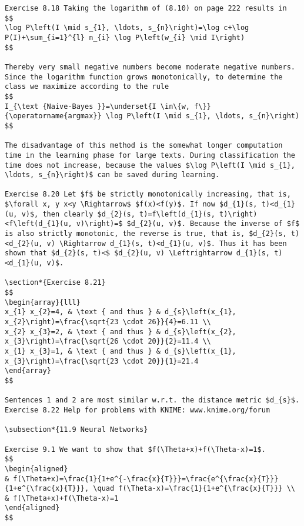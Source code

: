 \documentclass[10pt]{article}
\begin{document}
\begin{verbatim}
Exercise 8.18 Taking the logarithm of (8.10) on page 222 results in
$$
\log P\left(I \mid s_{1}, \ldots, s_{n}\right)=\log c+\log P(I)+\sum_{i=1}^{l} n_{i} \log P\left(w_{i} \mid I\right)
$$

Thereby very small negative numbers become moderate negative numbers. Since the logarithm function grows monotonically, to determine the class we maximize according to the rule
$$
I_{\text {Naive-Bayes }}=\underset{I \in\{w, f\}}{\operatorname{argmax}} \log P\left(I \mid s_{1}, \ldots, s_{n}\right)
$$

The disadvantage of this method is the somewhat longer computation time in the learning phase for large texts. During classification the time does not increase, because the values $\log P\left(I \mid s_{1}, \ldots, s_{n}\right)$ can be saved during learning.

Exercise 8.20 Let $f$ be strictly monotonically increasing, that is, $\forall x, y x<y \Rightarrow$ $f(x)<f(y)$. If now $d_{1}(s, t)<d_{1}(u, v)$, then clearly $d_{2}(s, t)=f\left(d_{1}(s, t)\right)<f\left(d_{1}(u, v)\right)=$ $d_{2}(u, v)$. Because the inverse of $f$ is also strictly monotonic, the reverse is true, that is, $d_{2}(s, t)<d_{2}(u, v) \Rightarrow d_{1}(s, t)<d_{1}(u, v)$. Thus it has been shown that $d_{2}(s, t)<$ $d_{2}(u, v) \Leftrightarrow d_{1}(s, t)<d_{1}(u, v)$.

\section*{Exercise 8.21}
$$
\begin{array}{lll}
x_{1} x_{2}=4, & \text { and thus } & d_{s}\left(x_{1}, x_{2}\right)=\frac{\sqrt{23 \cdot 26}}{4}=6.11 \\
x_{2} x_{3}=2, & \text { and thus } & d_{s}\left(x_{2}, x_{3}\right)=\frac{\sqrt{26 \cdot 20}}{2}=11.4 \\
x_{1} x_{3}=1, & \text { and thus } & d_{s}\left(x_{1}, x_{3}\right)=\frac{\sqrt{23 \cdot 20}}{1}=21.4
\end{array}
$$

Sentences 1 and 2 are most similar w.r.t. the distance metric $d_{s}$.
Exercise 8.22 Help for problems with KNIME: www.knime.org/forum

\subsection*{11.9 Neural Networks}

Exercise 9.1 We want to show that $f(\Theta+x)+f(\Theta-x)=1$.
$$
\begin{aligned}
& f(\Theta+x)=\frac{1}{1+e^{-\frac{x}{T}}}=\frac{e^{\frac{x}{T}}}{1+e^{\frac{x}{T}}}, \quad f(\Theta-x)=\frac{1}{1+e^{\frac{x}{T}}} \\
& f(\Theta+x)+f(\Theta-x)=1
\end{aligned}
$$


\end{verbatim}
\end{document}
